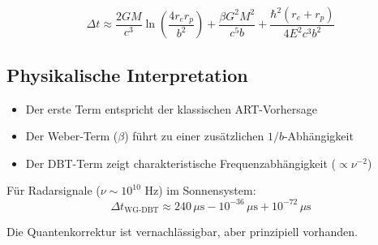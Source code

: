 \begin{equation}
\Delta t \approx \frac{2GM}{c^3}\ln\left(\frac{4r_e r_p}{b^2}\right) + \frac{\beta G^2M^2}{c^5b} + \frac{\hbar^2(r_e + r_p)}{4E^2c^3b^2}
\end{equation}

\subsection{Physikalische Interpretation}
\begin{itemize}
\item Der erste Term entspricht der klassischen ART-Vorhersage
\item Der Weber-Term ($\beta$) führt zu einer zusätzlichen $1/b$-Abhängigkeit
\item Der DBT-Term zeigt charakteristische Frequenzabhängigkeit ($\propto \nu^{-2}$)
\end{itemize}

Für Radarsignale ($\nu \sim 10^{10}$ Hz) im Sonnensystem:
\begin{equation}
\Delta t_{\text{WG-DBT}} \approx 240\,\mu\text{s} - 10^{-36}\,\mu\text{s} + 10^{-72}\,\mu\text{s}
\end{equation}

Die Quantenkorrektur ist vernachlässigbar, aber prinzipiell vorhanden.

